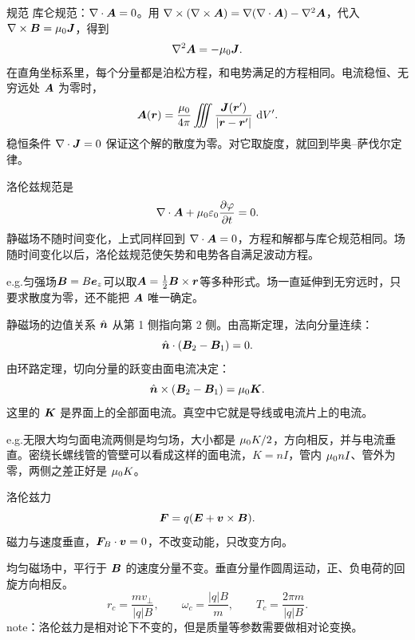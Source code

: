 \begin{frame}{规范}
库仑规范：$\nabla\cdot\bm{A}=0$。用 $\nabla\times(\nabla\times\bm{A})=\nabla(\nabla\cdot\bm{A})-\nabla^2\bm{A}$，代入 $\nabla\times\bm{B}=\mu_0\bm{J}$，得到
\[
 \nabla^2\bm{A}=-\mu_0\bm{J}.
\]
在直角坐标系里，每个分量都是泊松方程，和电势满足的方程相同。电流稳恒、无穷远处 $\bm{A}$ 为零时，
\[
 \bm{A}(\bm{r})=\frac{\mu_0}{4\pi}\iiint\frac{\bm{J}(\bm{r}')}{|\bm{r}-\bm{r}'|}\,\mathop{}\!\mathrm d V'.
\]
稳恒条件 $\nabla\cdot\bm{J}=0$ 保证这个解的散度为零。对它取旋度，就回到毕奥--萨伐尔定律。

洛伦兹规范是
\[
 \nabla\cdot\bm{A}+\mu_0\varepsilon_0\frac{\partial\varphi}{\partial t}=0.
\]
静磁场不随时间变化，上式同样回到 $\nabla\cdot\bm{A}=0$，方程和解都与库仑规范相同。场随时间变化以后，洛伦兹规范使矢势和电势各自满足波动方程。

e.g.匀强场$\bm{B}=B\bm{e}_z$可以取$\bm{A}=\frac12\bm{B}\times\bm{r}$等多种形式。场一直延伸到无穷远时，只要求散度为零，还不能把 $\bm{A}$ 唯一确定。
\end{frame}

\begin{frame}{静磁场的边值关系}
$\hat{\bm{n}}$ 从第 1 侧指向第 2 侧。由高斯定理，法向分量连续：
\[
 \hat{\bm{n}}\cdot(\bm{B}_2-\bm{B}_1)=0.
\]
由环路定理，切向分量的跃变由面电流决定：
\[
 \hat{\bm{n}}\times(\bm{B}_2-\bm{B}_1)=\mu_0\bm{K}.
\]
这里的 $\bm{K}$ 是界面上的全部面电流。真空中它就是导线或电流片上的电流。

e.g.无限大均匀面电流两侧是均匀场，大小都是 $\mu_0 K/2$，方向相反，并与电流垂直。密绕长螺线管的管壁可以看成这样的面电流，$K=nI$，管内 $\mu_0 nI$、管外为零，两侧之差正好是 $\mu_0 K$。

\end{frame}

\begin{frame}{洛伦兹力}
\[
 \bm{F}=q(\bm{E}+\bm{v}\times\bm{B}).
\]
磁力与速度垂直，$\bm{F}_B\cdot\bm{v}=0$，不改变动能，只改变方向。

均匀磁场中，平行于 $\bm{B}$ 的速度分量不变。垂直分量作圆周运动，正、负电荷的回旋方向相反。
\[
 r_c=\frac{mv_\perp}{|q|B},\qquad
 \omega_c=\frac{|q|B}{m},\qquad
 T_c=\frac{2\pi m}{|q|B}.
\]
note：洛伦兹力是相对论下不变的，但是质量等参数需要做相对论变换。
\end{frame}

